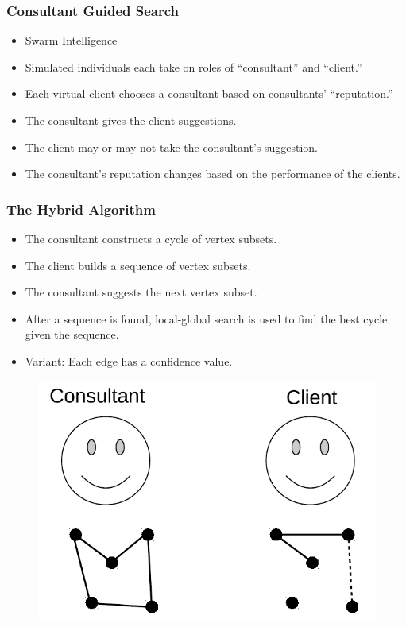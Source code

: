 \documentclass{beamer}
\begin{document}
\begin{frame}
\frametitle{Consultant Guided Search}
	\begin{itemize}
	\item Swarm Intelligence
	\item Simulated individuals each take on roles of ``consultant'' and ``client.''
	\item Each virtual client chooses a consultant based on consultants' ``reputation.''
	\item The consultant gives the client suggestions.
	\item The client may or may not take the consultant's suggestion. 
	\item The consultant's reputation changes based on the performance of the clients. 
	\end{itemize}

\end{frame}

\begin{frame}
\frametitle{The Hybrid Algorithm}
\begin{itemize}
	\item The consultant constructs a cycle of vertex subsets. 
	\item The client builds a sequence of vertex subsets. 
	\item The consultant suggests the next vertex subset. 
	\item After a sequence is found, local-global search is used to find the best cycle given the sequence. 
	\item Variant: Each edge has a confidence value. 
\end{itemize}
\begin{figure}
	\centering
	\includegraphics[scale=0.55]{CGSExample.pdf}

\end{figure}

\end{frame}
\end{document}
